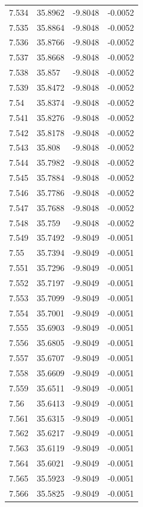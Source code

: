 \begin{tabular}{llll}
7.534 & 35.8962 & -9.8048 & -0.0052 \\
7.535 & 35.8864 & -9.8048 & -0.0052 \\
7.536 & 35.8766 & -9.8048 & -0.0052 \\
7.537 & 35.8668 & -9.8048 & -0.0052 \\
7.538 & 35.857 & -9.8048 & -0.0052 \\
7.539 & 35.8472 & -9.8048 & -0.0052 \\
7.54 & 35.8374 & -9.8048 & -0.0052 \\
7.541 & 35.8276 & -9.8048 & -0.0052 \\
7.542 & 35.8178 & -9.8048 & -0.0052 \\
7.543 & 35.808 & -9.8048 & -0.0052 \\
7.544 & 35.7982 & -9.8048 & -0.0052 \\
7.545 & 35.7884 & -9.8048 & -0.0052 \\
7.546 & 35.7786 & -9.8048 & -0.0052 \\
7.547 & 35.7688 & -9.8048 & -0.0052 \\
7.548 & 35.759 & -9.8048 & -0.0052 \\
7.549 & 35.7492 & -9.8049 & -0.0051 \\
7.55 & 35.7394 & -9.8049 & -0.0051 \\
7.551 & 35.7296 & -9.8049 & -0.0051 \\
7.552 & 35.7197 & -9.8049 & -0.0051 \\
7.553 & 35.7099 & -9.8049 & -0.0051 \\
7.554 & 35.7001 & -9.8049 & -0.0051 \\
7.555 & 35.6903 & -9.8049 & -0.0051 \\
7.556 & 35.6805 & -9.8049 & -0.0051 \\
7.557 & 35.6707 & -9.8049 & -0.0051 \\
7.558 & 35.6609 & -9.8049 & -0.0051 \\
7.559 & 35.6511 & -9.8049 & -0.0051 \\
7.56 & 35.6413 & -9.8049 & -0.0051 \\
7.561 & 35.6315 & -9.8049 & -0.0051 \\
7.562 & 35.6217 & -9.8049 & -0.0051 \\
7.563 & 35.6119 & -9.8049 & -0.0051 \\
7.564 & 35.6021 & -9.8049 & -0.0051 \\
7.565 & 35.5923 & -9.8049 & -0.0051 \\
7.566 & 35.5825 & -9.8049 & -0.0051 \\

\end{tabular}
